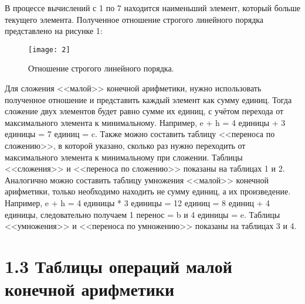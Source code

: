 \documentclass[10pt,a4paper,final]{article} %
\begin{document}
	В процессе вычислений с 1 по 7 находится наименьший элемент, который больше текущего элемента. Полученное отношение строгого линейного порядка представлено на рисунке 1:
	
		\begin{figure}[h!]
		\centering
		\texttt{[image: 2]}
		\caption{Отношение строгого линейного порядка.}
	\end{figure}
	
	Для сложения <<малой>> конечной арифметики, нужно использовать полученное отношение и представить каждый элемент как сумму единиц. Тогда сложение двух элементов будет равно сумме их единиц, с учётом перехода от максимального элемента к минимальному. Например, e + h = 4 единицы + 3 единицы = 7 единиц = c. Также можно составить таблицу <<переноса по сложению>>, в которой указано, сколько раз нужно переходить от максимального элемента к минимальному при сложении. Таблицы <<сложения>> и <<переноса по сложению>> показаны на таблицах 1 и 2. Аналогично можно составить таблицу умножения <<малой>> конечной арифметики, только необходимо находить не сумму единиц, а их произведение. Например, e + h = 4 единицы * 3 единицы = 12 единиц = 8 единиц + 4 единицы, следовательно получаем 1 перенос = b и 4 единицы = e. Таблицы <<умножения>> и <<переноса по умножению>> показаны на таблицах 3 и 4.
	
	\section*{1.3 Таблицы операций малой конечной арифметики}
	
\end{document}
